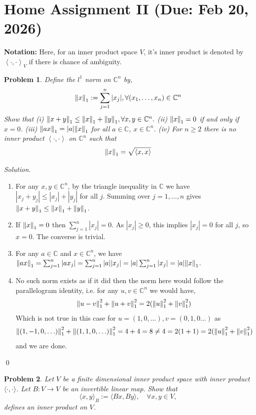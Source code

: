 \documentclass[12pt,a4paper]{article}
\newenvironment{solution}{%
  \par\noindent\textit{Solution.}\ }{\qed}
\theoremstyle{problemstyle}
\newtheorem{problem}{Problem}[section]
\def\bC{\mathbb{C}}
\newcommand{\inp}[2]{{\left\langle{#1},{#2}\right\rangle}}
\begin{document}
\section{Home Assignment II (Due: Feb 20, 2026)}
\noindent \textbf{Notation:} Here, for an inner product space $V$, it's inner product is denoted by $\inp{\cdot}{\cdot}_V$ if there is chance of ambiguity.
\begin{problem}\label{prob:2-1}
Define the $l^1$ norm on $\bC^n$ by,
\[\norm{x}_1:=\sum_{j=1}^n|x_j|,\forall(x_1,\ldots,x_n)\in\bC^n\]
Show that (i) $\norm{x+y}_1\leq\norm{x}_1+\norm{y}_1,\forall x,y\in\bC^n.$ (ii) $\norm{x}_1=0$ if and only if $x=0$.
(iii) $\norm{ax}_1=|a|\norm{x}_1$ for all $a\in\bC$, $x\in\bC^n$.
(iv) For $n\geq 2$ there is no inner product $\inp{\cdot}{\cdot}$ on $\bC^n$ such that
\[\norm{x}_1=\sqrt{\inp{x}{x}}\]
\end{problem}
\begin{solution}
	\begin{enumerate}[\label=(\roman*)]
    \item For any $x,y\in\bC^n$, by the triangle inequality in $\bC$ we have $|x_j+y_j|\le|x_j|+|y_j|$ for all $j$.
Summing over $j=1,\ldots,n$ gives $\norm{x+y}_1\le\norm{x}_1+\norm{y}_1$.
    \item If $\norm{x}_1=0$ then $\sum_{j=1}^n|x_j|=0$.
As $|x_j|\ge 0$, this implies $|x_j|=0$ for all $j$, so $x=0$. The converse is trivial.
    \item For any $a\in\bC$ and $x\in\bC^n$, we have $\norm{ax}_1=\sum_{j=1}^n|ax_j|=\sum_{j=1}^n|a||x_j|=|a|\sum_{j=1}^n|x_j|=|a|\norm{x}_1$.
    \item No such norm exists as if it did then the norm here would follow the parallelogram identity, i.e. for any $u,v\in\bC^n$ we would have,
	$$\norm{u-v}_1^2+\norm{u+v}_1^2=2(\norm{u}_1^2+\norm{v}_1^2)$$
	Which is not true in this case for $u=(1,0,\ldots),v=(0,1,0\ldots)$ as
$$\norm{(1,-1,0,\ldots)}_1^2+\norm{(1,1,0,\ldots)}_1^2=4+4=8\neq4=2(1+1)=2(\norm{u}_1^2+\norm{v}_1^2)$$
	and we are done.
	\end{enumerate}
\end{solution}
\begin{problem}\label{prob:2-2}
Let $V$ be a finite dimensional inner product space with inner product $\langle \cdot, \cdot \rangle$.
Let $B:V\rightarrow V$ be an invertible linear map. Show that
$$\langle x,y \rangle_B := \langle Bx, By \rangle, \quad \forall x, y \in V,$$
defines an inner product on $V$.
\end{problem}
\end{document}
